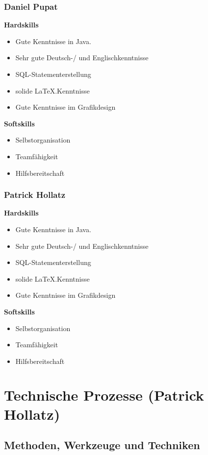 \documentclass[fontsize=12pt,paper=a4,twoside]{scrartcl}
\begin{document}
\subsubsection{Daniel Pupat}

\textbf{Hardskills}
\begin{itemize}
\item{Gute Kenntnisse in Java.}
\item{Sehr gute Deutsch-/ und Englischkenntnisse}
\item{SQL-Statementerstellung}
\item{solide \LaTeX.Kenntnisse}
\item{Gute Kenntnisse im Grafikdesign}
\end{itemize}
\textbf{Softskills}
\begin{itemize}
\item{Selbstorganisation}
\item{Teamfähigkeit}
\item{Hilfsbereitschaft}
\end{itemize}

\subsubsection{Patrick Hollatz}

\textbf{Hardskills}
\begin{itemize}
\item{Gute Kenntnisse in Java.}
\item{Sehr gute Deutsch-/ und Englischkenntnisse}
\item{SQL-Statementerstellung}
\item{solide \LaTeX.Kenntnisse}
\item{Gute Kenntnisse im Grafikdesign}
\end{itemize}
\textbf{Softskills}
\begin{itemize}
\item{Selbstorganisation}
\item{Teamfähigkeit}
\item{Hilfsbereitschaft}
\end{itemize}




\section{Technische Prozesse (Patrick Hollatz)}
\subsection{Methoden, Werkzeuge und Techniken}
\end{document}
